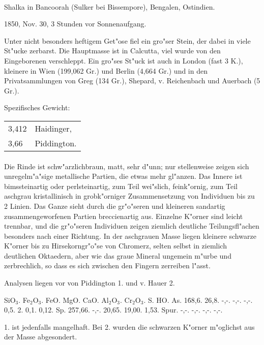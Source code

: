 \documentclass[a4paper, 11pt, oneside]{article}
\begin{document}
\paragraph{}
Shalka in Bancoorah (Sulker bei Bissempore), Bengalen, Ostindien.

1850, Nov. 30, 3 Stunden vor Sonnenaufgang.

Unter nicht besonders heftigem Get"ose fiel ein gro"ser Stein, der dabei in viele St"ucke zerbarst. Die Hauptmasse ist in Calcutta, viel wurde von den Eingeborenen verschleppt. Ein gro"ses St"uck ist auch in London (fast 3 K.), kleinere in Wien (199,062 Gr.) und Berlin (4,664 Gr.) und in den Privatsammlungen von Greg (134 Gr.), Shepard, v. Reichenbach und Auerbach (5 Gr.).

Spezifisches Gewicht:  
\begin{table}[!ht]
    \centering
    \begin{tabular}{l l}
        3,412 & Haidinger,\\
        3,66 & Piddington.
    \end{tabular}
\end{table}
\paragraph{}
Die Rinde ist schw"arzlichbraun, matt, sehr d"unn; nur stellenweise zeigen sich unregelm"a"sige metallische Partien, die etwas mehr gl"anzen. Das Innere ist bimssteinartig oder perlsteinartig, zum Teil wei"slich, feink"ornig, zum Teil aschgrau kristallinisch in grobk"orniger Zusammensetzung von Individuen bis zu 2 Linien. Das Ganze sieht durch die gr"o"seren und kleineren sandartig zusammengeworfenen Partien breccienartig aus. Einzelne K"orner sind leicht trennbar, und die gr"o"seren Individuen zeigen ziemlich deutliche Teilungsfl"achen besonders nach einer Richtung. In der aschgrauen Masse liegen kleinere schwarze K"orner bis zu Hirsekorngr"o"se von Chromerz, selten selbst in ziemlich deutlichen Oktaedern, aber wie das graue Mineral ungemein m"urbe und zerbrechlich, so dass es sich zwischen den Fingern zerreiben l"asst.

Analysen liegen vor von Piddington 1. und v. Hauer 2.

SiO$_{3}$. Fe$_{2}$O$_{3}$. FeO. MgO. CaO. Al$_{2}$O$_{3}$. Cr$_{2}$O$_{3}$. S. HO. As.  
1\. 68,6. 26,8. -,-. -,-. -,-. 0,5. 2. 0,1. 0,12. Sp.  
2\. 57,66. -,-. 20,65. 19,00. 1,53. Spur. -,-. -,-. -,-. -,-.

1. ist jedenfalls mangelhaft. Bei 2. wurden die schwarzen K"orner m"oglichst aus der Masse abgesondert.
\end{document}
